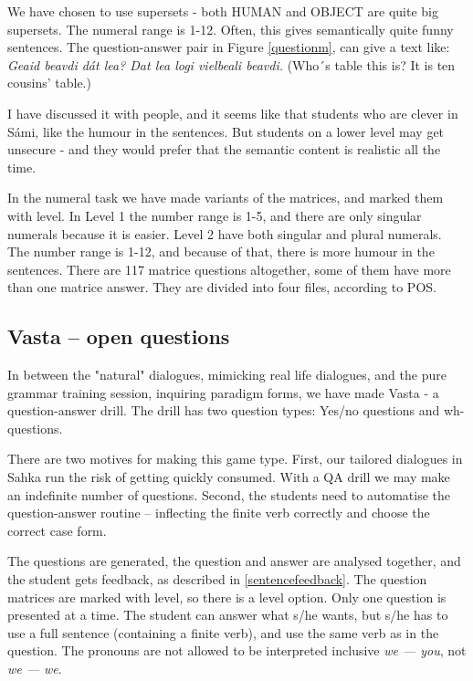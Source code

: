 \documentclass[a4paper,12pt]{article}
\begin{document}
We have chosen to use supersets - both HUMAN and OBJECT are quite big supersets. The numeral range is 1-12. Often, this gives semantically quite funny sentences. The question-answer pair in Figure \ref{questionm}, can give a text like: \textit{Geaid beavdi dát lea? Dat lea logi vielbeali beavdi.} (Who´s table this is? It is ten cousins’ table.) 

I have discussed it with people, and it seems like that students who are clever in Sámi, like the humour in the sentences. But students on a lower level may get unsecure - and they would prefer that the semantic content is realistic all the time.   

In the numeral task we have made variants of the matrices, and marked them with level. In Level 1 the number range is 1-5, and there are only singular numerals because it is easier. Level 2 have both singular and plural numerals. The number range is 1-12, and because of that, there is more humour in the sentences. There are  117 matrice questions altogether, some of them have more than one matrice answer. They are divided into four files, according to POS.




\subsection{Vasta -- open questions}	

In between the "natural" dialogues, mimicking real life dialogues, and the pure grammar training session, inquiring paradigm forms, we have made Vasta - a question-answer drill. The drill has two question types: Yes/no questions and wh-questions. 

There are two motives for making this game type. First, our tailored dialogues in Sahka run the risk of getting quickly consumed. With a QA drill we may make an indefinite number of questions. Second, the students need to automatise the question-answer routine -- inflecting the finite verb correctly and choose the correct case form.

The questions are generated, the question and answer are analysed together, and the student gets feedback, as described in \ref{sentencefeedback}. The question matrices are marked with level, so there is a level option. Only one question is presented at a time. The student can answer what s/he wants, but s/he has to use a full sentence (containing a finite verb), and use the same verb as in the question. The pronouns are not allowed to be interpreted inclusive \textit{we — you}, not \textit{we — we}.
\end{document}
